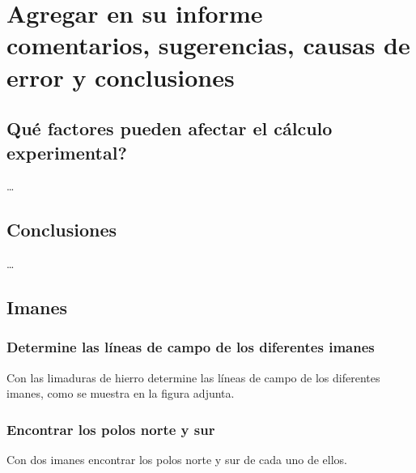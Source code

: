 \section{Agregar en su informe comentarios, sugerencias, causas de error y
  conclusiones}

\subsection{Qué factores pueden afectar el cálculo experimental?}
\dots



\subsection{Conclusiones}
\dots


\subsection{Imanes}

\subsubsection{Determine las líneas de campo de los diferentes imanes}
Con las limaduras de hierro determine las líneas de campo de los diferentes
imanes, como se muestra en la figura adjunta.


\subsubsection{Encontrar los polos norte y sur}
Con dos imanes encontrar los polos norte y sur de cada uno de ellos.


